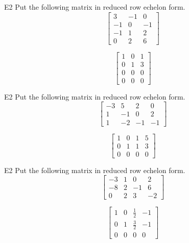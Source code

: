 \begin{problem}{E2}
Put the following matrix in reduced row echelon form.
\[
  \begin{bmatrix}
   3 & -1 & 0 \\
   -1 & 0 & -1 \\
   -1 & 1 & 2 \\
   0 & 2 & 6
  \end{bmatrix}
\]
\end{problem}
\begin{solution}

\[
  \begin{bmatrix}
   1 & 0 & 1 \\
   0 & 1 & 3 \\
   0 & 0 & 0 \\
  0 & 0 & 0
  \end{bmatrix}
\]
\end{solution}

\begin{problem}{E2}
Put the following matrix in reduced row echelon form.
\[
  \begin{bmatrix}
    -3 & 5 & 2 & 0 \\
    1 & -1 & 0 & 2 \\
    1 & -2 & -1 & -1
  \end{bmatrix}
\]
\end{problem}
\begin{solution}
\[
  \begin{bmatrix}
   1 & 0 & 1 & 5 \\
   0 & 1 & 1 & 3 \\
   0 & 0 & 0 & 0
  \end{bmatrix}
\]
\end{solution}

\begin{problem}{E2}
Put the following matrix in reduced row echelon form.
\[
  \begin{bmatrix}
    -3 & 1 & 0 & 2 \\
    -8 & 2 & -1 & 6 \\
    0 & 2 & 3 & -2
  \end{bmatrix}
\]
\end{problem}
\begin{solution}
\[
  \begin{bmatrix}
  1 & 0 & \frac{1}{2} & -1 \\
   0 & 1 & \frac{3}{2} & -1 \\
   0 & 0 & 0 & 0
  \end{bmatrix}
\]
\end{solution}

